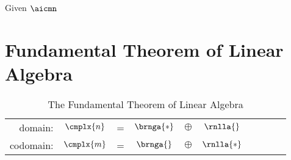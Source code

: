 \documentclass{amsbook}
\begin{document}
Given $\aicmn$

\section{\label{sec:ftola}Fundamental Theorem of Linear Algebra}  %
  \begin{table}[htdp]  %
    \caption[The Fundamental Theorem of Linear Algebra]{The Fundamental Theorem of Linear Algebra }
    \begin{center}
    		\begin{tabular}{rccccccccc}
    		  domain:   & $\cmplx{n}$ & = & $\brnga{*}$ & $\oplus$ & $\rnlla{}$ \\[17pt]
    		  codomain: & $\cmplx{m}$ & = & $\brnga{}$  & $\oplus$ & $\rnlla{*}$
      \end{tabular}
    \end{center}
  \label{tab:ftola}
  \end{table}%

\end{document}
